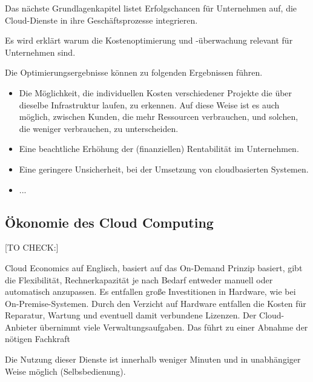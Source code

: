 Das nächste Grundlagenkapitel listet Erfolgschancen für Unternehmen auf, die Cloud-Dienste in ihre Geschäftsprozesse integrieren.

\begin{flushleft}
      Es wird erklärt warum die Kostenoptimierung und -überwachung relevant für Unternehmen sind.
\end{flushleft}


Die Optimierungsergebnisse können zu folgenden Ergebnissen führen.
\begin{itemize}
      \item
            Die Möglichkeit, die individuellen Kosten verschiedener Projekte die über dieselbe Infrastruktur laufen, zu erkennen. Auf diese Weise ist es auch möglich, zwischen Kunden, die mehr Ressourcen verbrauchen, und solchen, die weniger verbrauchen, zu unterscheiden.
      \item
            Eine beachtliche Erhöhung der (finanziellen) Rentabilität im Unternehmen.
      \item
            Eine geringere Unsicherheit, bei der Umsetzung von cloudbasierten Systemen.
      \item
            ...
\end{itemize}




\subsection{Ökonomie des Cloud Computing}\label{subsec_UabsGrund3}
[TO CHECK:]
\begin{flushleft}
      {
            Cloud Economics auf Englisch, basiert auf das On-Demand Prinzip basiert,
            gibt die Flexibilität, Rechnerkapazität je nach Bedarf entweder manuell oder automatisch anzupassen.
            Es entfallen große Investitionen in Hardware, wie bei On-Premise-Systemen.
            Durch den Verzicht auf Hardware entfallen die Kosten für Reparatur, Wartung und eventuell damit verbundene Lizenzen. Der Cloud-Anbieter übernimmt viele Verwaltungsaufgaben. Das führt zu einer Abnahme der nötigen Fachkraft 

            Die Nutzung dieser Dienste ist innerhalb weniger Minuten und in unabhängiger Weise möglich (Selbsbedienung). }
\end{flushleft}

